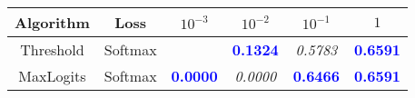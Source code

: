 \begin{table}[t]
\centering
\begin{tabularx}{.7\textwidth}{c|c|cccc}
\bf Algorithm & \bf Loss & $10^{-3}$ & $10^{-2}$ & $10^{-1}$ & $1$\\\hline\hline
\multirow{1}{*}{Threshold} & Softmax & & \textcolor{blue}{\bf 0.1324} & \it 0.5783 & \textcolor{blue}{\bf 0.6591}\\
\hline
\multirow{1}{*}{MaxLogits} & Softmax & \textcolor{blue}{\bf 0.0000} & \it 0.0000 & \textcolor{blue}{\bf 0.6466} & \textcolor{blue}{\bf 0.6591}\\
\hline
\end{tabularx}
\end{table}